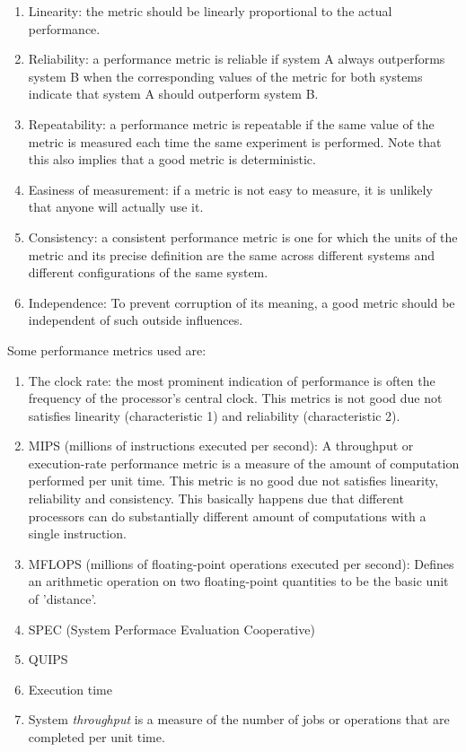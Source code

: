 \documentclass[openany, a4paper]{book}
\theoremstyle{break}
\theoremstyle{example}
\theoremstyle{note}
\theoremstyle{break}
\theoremstyle{exercise}
\begin{document}
\begin{enumerate}
\item Linearity: the metric should be linearly proportional to the actual
performance.
\item Reliability: a performance metric is reliable if system A always
outperforms system B when the corresponding values of the metric for both
systems indicate that system A should outperform system B.
\item Repeatability: a performance metric is repeatable if the same value of the
metric is measured each time the same experiment is performed. Note that
this also implies that a good metric is deterministic.
\item Easiness of measurement: if a metric is not easy to measure, it is
unlikely that anyone will actually use it.
\item Consistency: a consistent performance metric is one for which the units of
the metric and its precise definition are the same across different
systems and different configurations of the same system.
\item Independence: To prevent corruption of its meaning, a good metric should
be independent of such outside influences.
\end{enumerate}

Some performance metrics used are:

\begin{enumerate}
\item The clock rate: the most prominent indication of performance is often the
frequency of the processor's central clock. This metrics is not good due
not satisfies linearity (characteristic 1) and reliability
(characteristic 2).
\item MIPS (millions of instructions executed per second): A throughput or
execution-rate performance metric is a measure of the amount of
computation performed per unit time. This metric is no good due not
satisfies linearity, reliability and consistency. This basically happens
due that different processors can do substantially different amount of
computations with a single instruction.
\item MFLOPS (millions of floating-point operations executed per second):
Defines an arithmetic operation on two floating-point quantities to be the
basic unit of 'distance'.
\item SPEC (System Performace Evaluation Cooperative)
\item QUIPS
\item Execution time
\item System \emph{throughput} is a measure of the number of jobs or operations that
are completed per unit time.
\end{enumerate}
\end{document}
